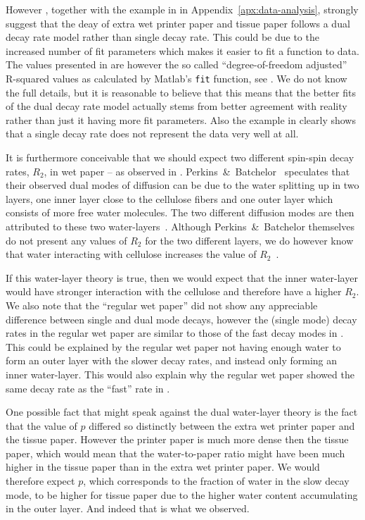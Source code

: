 \documentclass[11pt,a4paper, twocolumn,
swedish, english %
]{article}
\begin{document}
However , together with the example in
 in Appendix~\ref{apx:data-analysis},
strongly suggest that the deay of extra wet printer paper and tissue
paper follows a dual decay rate model rather than single decay rate.
This could be due to the increased number of fit parameters
which makes it easier to fit a function to data. The values presented
in  are however the so called
``degree-of-freedom adjusted'' R-squared values as calculated by
Matlab's \texttt{fit} function, see \cite{Matlab-fit}. We do not know the
full details, but it is reasonable to believe that this means that the
better fits of the dual decay rate model actually stems from better
agreement with reality rather than just it having more fit
parameters. Also the example in  clearly
shows that a single decay rate does not represent the data very well
at all.

It is furthermore conceivable that we should expect two different
spin-spin decay rates, $R_2$, in wet paper -- as observed in
. Perkins~\&~Batchelor~\cite{Perkins-Batchelor2012}
speculates that their observed dual modes of diffusion can be due to
the water splitting up in two layers, one inner layer close to the
cellulose fibers and one outer layer which consists of more free water
molecules. 
The two different diffusion modes are then attributed to these two
water-layers~\cite{Perkins-Batchelor2012}. Although
Perkins~\&~Batchelor themselves do not present any values of $R_2$ for
the two different layers, we do however know that water interacting
with cellulose increases the value of $R_2$~\cite{Ono-etal2004}.

If this water-layer theory is true, then we would expect that the
inner water-layer would have stronger interaction with the cellulose
and therefore have a higher $R_2$. We also note that the ``regular wet
paper'' did not show any appreciable difference between single and
dual mode decays, however the (single mode) decay rates in the regular
wet paper are similar to those of the fast decay modes in
. This could be explained by the regular wet
paper not having enough water to form an outer layer with the slower
decay rates, and instead only forming an inner water-layer.
This would also explain why the regular wet paper showed the same
decay rate as the ``fast'' rate in .

One possible fact that might speak against the dual water-layer
theory is the fact that the value of $p$ differed so distinctly
between the extra wet printer paper and the tissue paper. However the
printer paper is much more dense then the tissue paper, which would
mean that the water-to-paper ratio might have been much higher in the
tissue paper than in the extra wet printer paper. We would therefore
expect $p$, which corresponds to the fraction of water in the slow
decay mode, to be higher for tissue paper due to the higher water
content accumulating in the outer layer. And indeed that is what we
observed. 
\end{document}
